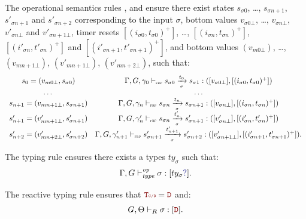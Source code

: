 \begin{skippableproof}
    The operational semantics rules ,
     and
     ensure there exist states $s_{\sigma 0}$,
    \dots, $s_{\sigma n+1}$, $s'_{\sigma n+1}$ and $s'_{\sigma n+2}$ corresponding to the input $\sigma$, bottom
    values $v_{\sigma 0\bot}$, \dots, $v_{\sigma n\bot}$, $v'_{\sigma n\bot}$ and $v'_{\sigma n+1\bot}$, timer resets
    $[(i_{\sigma0}, t_{\sigma0})^+]$, \dots, $[(i_{\sigma n}, t_{\sigma n})^+]$, $[(i'_{\sigma n},
        t'_{\sigma n})^+]$ and $[(i'_{\sigma n+1}, t'_{\sigma n+1})^+]$, and bottom values
    $(v_{m0\bot})$, \dots, $(v_{mn+1\bot})$, $(v'_{mn+1\bot})$, $(v'_{mn+2\bot})$,
    such that:
    \begin{equation*}
        \begin{array}{cc}
            s_0 = (v_{m0\bot}, s_{\sigma 0})            & \Gamma, G, \gamma_0 \vdash_{\textnormal{\tiny\textsc{frp}}} s_{\sigma 0} \xrightarrow[\mbox{\tiny\ensuremath{\sigma}}]{t_0} s_{\sigma 1}: ([v_{\sigma 0\bot}], [(i_{\sigma0}, t_{\sigma0})^+])                             \\
            \dots                                       & \dots                                                                                                                                      \\
            s_{n+1} = (v_{mn+1\bot}, s_{\sigma n+1})    & \Gamma, G, \gamma_n \vdash_{\textnormal{\tiny\textsc{frp}}} s_{\sigma n} \xrightarrow[\mbox{\tiny\ensuremath{\sigma}}]{t_n} s_{\sigma n+1}: ([v_{\sigma n\bot}], [(i_{\sigma n}, t_{\sigma n})^+])                         \\
            s'_{n+1} = (v'_{mn+1\bot}, s'_{\sigma n+1}) & \Gamma, G, \gamma'_n \vdash_{\textnormal{\tiny\textsc{frp}}} s_{\sigma n} \xrightarrow[\mbox{\tiny\ensuremath{\sigma}}]{t'_n} s'_{\sigma n+1}: ([v'_{\sigma n\bot}], [(i'_{\sigma n}, t'_{\sigma n})^+])                   \\
            s'_{n+2} = (v'_{mn+2\bot}, s'_{\sigma n+2}) & \Gamma, G, \gamma'_{n+1} \vdash_{\textnormal{\tiny\textsc{frp}}} s'_{\sigma n+1} \xrightarrow[\mbox{\tiny\ensuremath{\sigma}}]{t'_{n+1}} s'_{\sigma n+2}: ([v'_{\sigma n+1\bot}], [(i'_{\sigma n+1}, t'_{\sigma n+1})^+]).
        \end{array}
    \end{equation*}

    The typing rule  ensures there exists a types
    $ty_\sigma$ such that:
    \begin{align*}
        \flowTyped{\sigma}{\mayB{ty_\sigma}}.
    \end{align*}

    The reactive typing rule  ensures that
    $\rType = \dType$ and:
    \begin{equation*}
        \opTypedReact{\Theta}{\sigma}{\dType}.
    \end{equation*}


\end{skippableproof}
